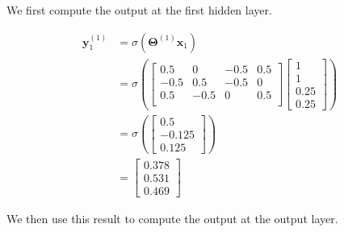 \documentclass[a4paper, 10pt, twoside]{article}
\begin{document}
\begin{enumerate}[a)]
	      We first compute the output at the first hidden layer.

	      \begin{align*}
		      \bm{y}_1^{(1)}
		       & = \sigma\left(\bm{\Theta}^{(1)}\bm{x}_1\right) \\
		       & = \sigma
		      \left(
		      \begin{bmatrix}
				      0.5  & 0    & -0.5 & 0.5 \\
				      -0.5 & 0.5  & -0.5 & 0   \\
				      0.5  & -0.5 & 0    & 0.5 \\
			      \end{bmatrix}
		      \begin{bmatrix}
				      1 \\ 1 \\ 0.25 \\ 0.25
			      \end{bmatrix}
		      \right)                                           \\
		       & = \sigma
		      \left(
		      \begin{bmatrix}
				      0.5 \\ -0.125 \\ 0.125
			      \end{bmatrix}
		      \right)                                           \\
		       & =
		      \begin{bmatrix}
			      0.378 \\ 0.531 \\ 0.469
		      \end{bmatrix}
	      \end{align*}

	      We then use this result to compute the output at the output layer.


\end{enumerate}
\end{document}
